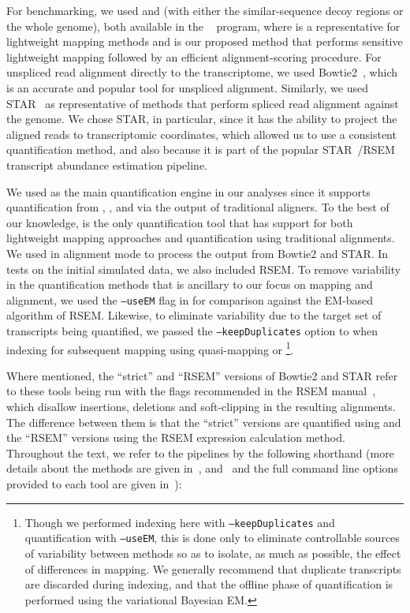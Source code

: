 For benchmarking, we used \qm and \hsa (with either the similar-sequence decoy regions or the whole genome), 
both available in the \salmon~\citep{salmon} program, where
\qm is a representative for lightweight mapping methods and \hsa is our proposed
method that performs sensitive lightweight mapping
followed by an efficient alignment-scoring procedure. For unspliced read
alignment directly to the transcriptome, we used Bowtie2~\citep{bowtie2}, which
is an accurate and popular tool for unspliced alignment. Similarly, we used
STAR~\citep{star} as representative of methods that perform spliced read
alignment against the genome. We chose STAR, in particular, since it has the
ability to project the aligned reads to transcriptomic coordinates, which allowed
us to use a consistent quantification method, and also because it is part of the
popular STAR~\citep{star}/RSEM~\citep{li2011rsem} transcript abundance estimation
pipeline.

We used \salmon as the main quantification engine in our analyses since it supports
quantification from \qm, \hsa, and via the output of traditional aligners. To
the best of our knowledge, \salmon is the only quantification tool
that has support for both lightweight mapping approaches and quantification
using traditional alignments. We used \salmon in alignment mode to process the
output from Bowtie2 and STAR. In tests on the initial simulated data, we also
included RSEM. To remove variability in the quantification methods that is
ancillary to our focus on mapping and alignment, we used the \texttt{--useEM}
flag in \salmon for comparison against the EM-based algorithm of RSEM. Likewise,
to eliminate variability due to the target set of transcripts being quantified,
we passed the \texttt{--keepDuplicates} option to \salmon when indexing for
subsequent mapping using quasi-mapping or \hsa\footnote{Though we performed
  indexing here with \texttt{--keepDuplicates} and quantification with
  \texttt{--useEM}, this is done only to eliminate controllable sources of
  variability between methods so as to isolate, as much as possible, the effect
  of differences in mapping. We generally recommend that duplicate transcripts
  are discarded during indexing, and that the offline phase of quantification is
  performed using the variational Bayesian EM.}.
  
Where mentioned, the ``strict'' and ``RSEM'' versions of Bowtie2 and STAR refer to these tools
being run with the flags recommended in the RSEM manual~\cite{rsem_manual},
which disallow insertions, deletions and soft-clipping in the resulting
alignments. The difference between them is that the ``strict'' versions are
quantified using \salmon and the ``RSEM'' versions using the RSEM expression
calculation method. Throughout the text, we refer to the pipelines by the
following shorthand (more details about the methods are given in~, and~ and
the full command line options provided to
each tool are given in~):

